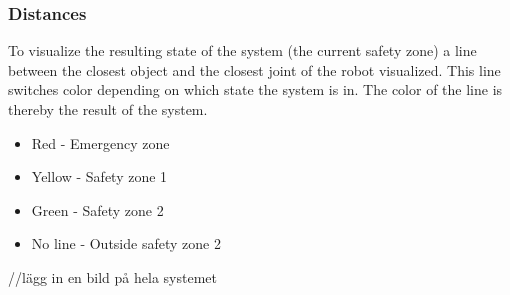 \subsubsection{Distances}
To visualize the resulting state of the system (the current safety zone) a line between the closest object and the closest joint of the robot visualized. This line switches color depending on which state the system is in. The color of the line is thereby the result of the system. 

\begin{itemize}
  \item Red - Emergency zone
  \item Yellow - Safety zone 1 
  \item Green - Safety zone 2
  \item No line - Outside safety zone 2 
\end{itemize}

//lägg in en bild på hela systemet

